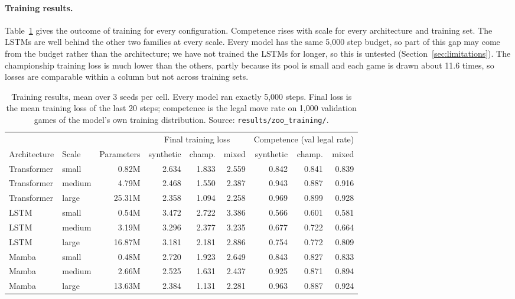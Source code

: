 \documentclass[11pt]{scrartcl}
\begin{document}
\paragraph{Training results.} Table~\ref{tab:training} gives the outcome of training for every configuration.
Competence rises with scale for every architecture and training set. The LSTMs are well behind the other
two families at every scale. Every model has the same 5,000 step budget, so part of this gap may come from
the budget rather than the architecture; we have not trained the LSTMs for longer, so this is untested
(Section~\ref{sec:limitations}). The championship training loss is much lower than the others, partly
because its pool is small and each game is drawn about 11.6 times, so losses are comparable within a column
but not across training sets.

\begin{table}[H]
    \centering
    \small
    \setlength{\tabcolsep}{4.5pt}
    \begin{tabular}{llrrrrrrr}
    \toprule
    & & & \multicolumn{3}{c}{Final training loss} & \multicolumn{3}{c}{Competence (val legal rate)} \\
    \cmidrule(lr){4-6}\cmidrule(lr){7-9}
    Architecture & Scale & Parameters & synthetic & champ. & mixed & synthetic & champ. & mixed \\
    \midrule
    Transformer & small  & 0.82M  & 2.634 & 1.833 & 2.559 & 0.842 & 0.841 & 0.839 \\
    Transformer & medium & 4.79M  & 2.468 & 1.550 & 2.387 & 0.943 & 0.887 & 0.916 \\
    Transformer & large  & 25.31M & 2.358 & 1.094 & 2.258 & 0.969 & 0.899 & 0.928 \\
    LSTM        & small  & 0.54M  & 3.472 & 2.722 & 3.386 & 0.566 & 0.601 & 0.581 \\
    LSTM        & medium & 3.19M  & 3.296 & 2.377 & 3.235 & 0.677 & 0.722 & 0.664 \\
    LSTM        & large  & 16.87M & 3.181 & 2.181 & 2.886 & 0.754 & 0.772 & 0.809 \\
    Mamba       & small  & 0.48M  & 2.720 & 1.923 & 2.649 & 0.843 & 0.827 & 0.833 \\
    Mamba       & medium & 2.66M  & 2.525 & 1.631 & 2.437 & 0.925 & 0.871 & 0.894 \\
    Mamba       & large  & 13.63M & 2.384 & 1.131 & 2.281 & 0.963 & 0.887 & 0.924 \\
    \bottomrule
    \end{tabular}
    \caption{Training results, mean over 3 seeds per cell. Every model ran exactly 5,000 steps. Final loss is
    the mean training loss of the last 20 steps; competence is the legal move rate on 1,000 validation games
    of the model's own training distribution. Source: \texttt{results/zoo\_training/}.}
    \label{tab:training}
\end{table}
\end{document}
